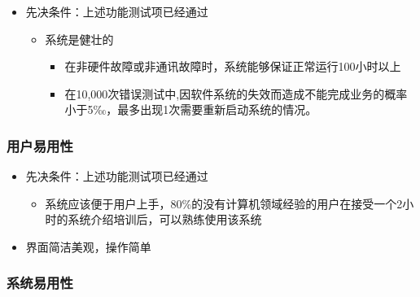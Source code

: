 \documentclass[hyperref, a4paper]{ctexart}
\providecommand{\tightlist}{%
  \setlength{\itemsep}{0pt}\setlength{\parskip}{0pt}}
\begin{document}
\begin{itemize}
\tightlist
\item
  先决条件：上述功能测试项已经通过

  \begin{itemize}
  \tightlist
  \item
    系统是健壮的

    \begin{itemize}
    \tightlist
    \item
      在非硬件故障或非通讯故障时，系统能够保证正常运行100小时以上
    \item
      在10,000次错误测试中,因软件系统的失效而造成不能完成业务的概率小于5‰，最多出现1次需要重新启动系统的情况。
    \end{itemize}
  \end{itemize}
\end{itemize}

\hypertarget{ux7528ux6237ux6613ux7528ux6027}{%
\subsubsection{用户易用性}\label{ux7528ux6237ux6613ux7528ux6027}}

\begin{itemize}
\tightlist
\item
  先决条件：上述功能测试项已经通过

  \begin{itemize}
  \tightlist
  \item
    系统应该便于用户上手，80\%的没有计算机领域经验的用户在接受一个2小时的系统介绍培训后，可以熟练使用该系统
  \end{itemize}
\item
  界面简洁美观，操作简单
\end{itemize}

\hypertarget{ux7cfbux7edfux6613ux7528ux6027}{%
\subsubsection{系统易用性}\label{ux7cfbux7edfux6613ux7528ux6027}}
\end{document}
